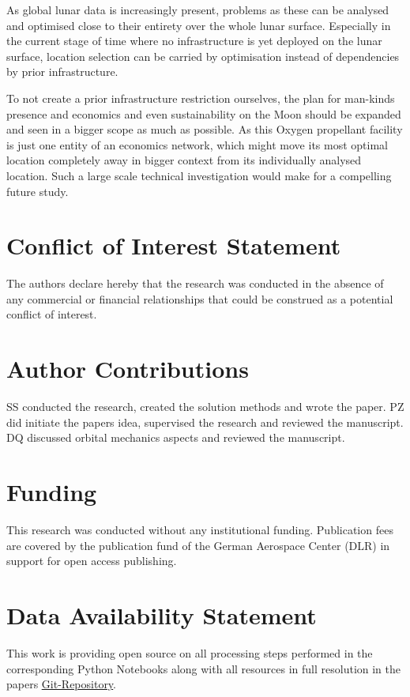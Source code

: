 \documentclass[utf8]{FrontiersinHarvard} %
\begin{document}
As global lunar data is increasingly present, problems as these can be analysed and optimised close to their entirety over the whole lunar surface.
Especially in the current stage of time where no infrastructure is yet deployed on the lunar surface, location selection can be carried by optimisation instead of dependencies by prior infrastructure.

To not create a prior infrastructure restriction ourselves, the plan for man-kinds presence and economics and even sustainability on the Moon should be expanded and seen in a bigger scope as much as possible. As this Oxygen propellant facility is just one entity of an economics network, which might move its most optimal location completely away in bigger context from its individually analysed location. Such a large scale technical investigation would make for a compelling future study.

\section*{Conflict of Interest Statement}
The authors declare hereby that the research was conducted in the absence of any commercial or financial relationships that could be construed as a potential conflict of interest.

\section*{Author Contributions}
SS conducted the research, created the solution methods and wrote the paper.
PZ did initiate the papers idea, supervised the research and reviewed the manuscript.
DQ discussed orbital mechanics aspects and reviewed the manuscript. 

\section*{Funding}
This research was conducted without any institutional funding.
Publication fees are covered by the publication fund of the German Aerospace Center (DLR) in support for open access publishing.

\section*{Data Availability Statement}
This work is providing open source on all processing steps performed in the corresponding Python Notebooks along with all resources in full resolution in the papers \href{https://redirect.sven-j-steinert.de/?id=2023_DLR}{\underline{Git-Repository}}.
\end{document}
